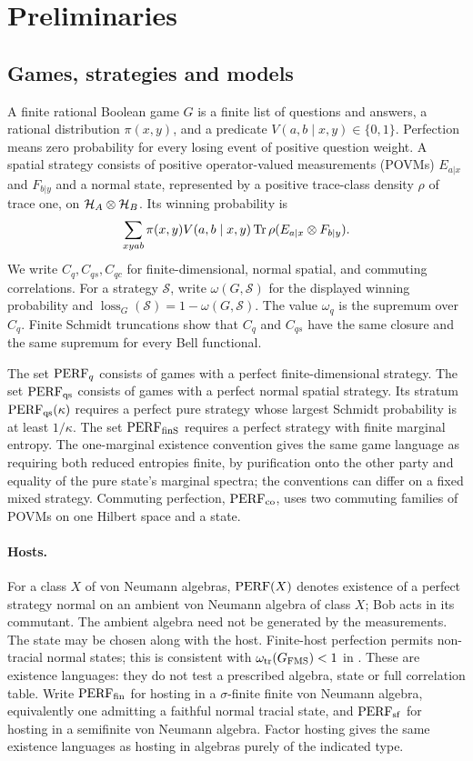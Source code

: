 \section{Preliminaries}\label{sec:prelim}
\subsection{Games, strategies and models}
A finite rational Boolean game $G$ is a finite list of questions and answers, a rational distribution $\pi(x,y)$, and a predicate $V(a,b\mid x,y)\in\{0,1\}$. Perfection means zero probability for every losing event of positive question weight. A spatial strategy consists of positive operator-valued measurements (POVMs) $E_{a|x}$ and $F_{b|y}$ and a normal state, represented by a positive trace-class density $\rho$ of trace one, on $\mathcal H_A\otimes\mathcal H_B$. Its winning probability is
\[
 \sum_{xyab}\pi(x,y)V(a,b\mid x,y)\operatorname{Tr}\rho(E_{a|x}\otimes F_{b|y}).
\]
We write $C_q,C_{qs},C_{qc}$ for finite-dimensional, normal spatial, and commuting correlations. For a strategy $\mathcal S$, write $\omega(G,\mathcal S)$ for the displayed winning probability and $\operatorname{loss}_G(\mathcal S)=1-\omega(G,\mathcal S)$. The value $\omega_q$ is the supremum over $C_q$. Finite Schmidt truncations show that $C_q$ and $C_{qs}$ have the same closure and the same supremum for every Bell functional.

The set $\mathrm{PERF}_q$ consists of games with a perfect finite-dimensional strategy. The set $\mathrm{PERF}_{\mathrm{qs}}$ consists of games with a perfect normal spatial strategy. Its stratum $\mathrm{PERF}_{\mathrm{qs}}(\kappa)$ requires a perfect pure strategy whose largest Schmidt probability is at least $1/\kappa$. The set $\mathrm{PERF}_{\mathrm{finS}}$ requires a perfect strategy with finite marginal entropy. The one-marginal existence convention gives the same game language as requiring both reduced entropies finite, by purification onto the other party and equality of the pure state's marginal spectra; the conventions can differ on a fixed mixed strategy. Commuting perfection, $\mathrm{PERF}_{\mathrm{co}}$, uses two commuting families of POVMs on one Hilbert space and a state.

\paragraph{Hosts.}
For a class $X$ of von Neumann algebras, $\mathrm{PERF}(X)$ denotes existence of a perfect strategy normal on an ambient von Neumann algebra of class $X$; Bob acts in its commutant. The ambient algebra need not be generated by the measurements. The state may be chosen along with the host. Finite-host perfection permits non-tracial normal states; this is consistent with $\omega_{\rm tr}(G_{\rm FMS})<1$ in \cite[Theorem~3]{Mancinska}. These are existence languages: they do not test a prescribed algebra, state or full correlation table. Write $\mathrm{PERF}_{\mathrm{fin}}$ for hosting in a $\sigma$-finite finite von Neumann algebra, equivalently one admitting a faithful normal tracial state, and $\mathrm{PERF}_{\mathrm{sf}}$ for hosting in a semifinite von Neumann algebra. Factor hosting gives the same existence languages as hosting in algebras purely of the indicated type.

